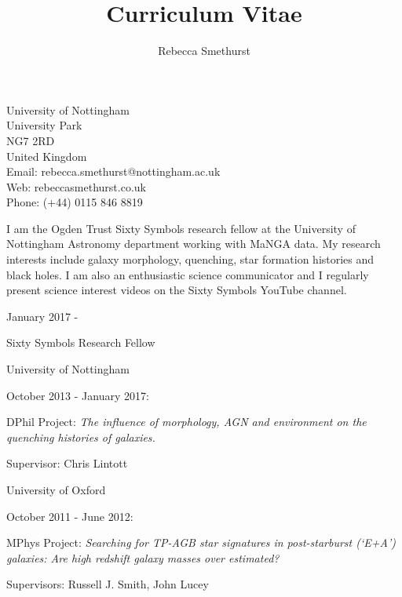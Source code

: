 \documentclass{article}
\begin{document}
\title{Curriculum Vitae}
\author{Rebecca Smethurst}

\maketitle

{\center

University of Nottingham \\
University Park \\
NG7 2RD \\
United Kingdom \\ 
\medskip
Email: rebecca.smethurst@nottingham.ac.uk \\
Web: rebeccasmethurst.co.uk \\
Phone: (+44) 0115 846 8819\\ 

}
\medskip
\noindent I am the Ogden Trust Sixty Symbols research fellow at the University of Nottingham Astronomy department working with MaNGA data. My research interests include galaxy morphology, quenching, star formation histories and black holes. I am also an enthusiastic science communicator and I regularly present science interest videos on the Sixty Symbols YouTube channel.

\noindent\makebox[\linewidth]{\rule{0.8\paperwidth}{0.2pt}}


\indent January 2017 -

\indent\indent Sixty Symbols Research Fellow

\indent\indent\indent University of Nottingham

\smallskip

\indent October 2013 - January 2017:

\hangindent=15pt \indent\indent DPhil Project: \emph{The influence of morphology, AGN and environment on the quenching histories of galaxies.}

\indent\indent\indent Supervisor: Chris Lintott

\indent\indent\indent University of Oxford

\smallskip

\indent October 2011 - June 2012:

\hangindent=30pt \indent\indent MPhys Project: \emph{Searching for TP-AGB star signatures in post-starburst (`E+A') galaxies: Are high redshift galaxy masses over estimated?}

\indent\indent\indent Supervisors: Russell J. Smith, John Lucey
\end{document}
